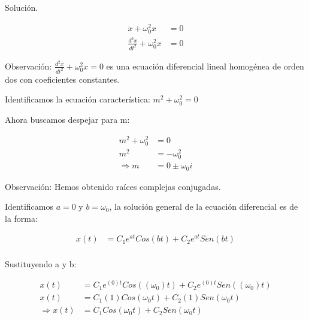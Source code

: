 

 Solución.

 \begin{align*}
    \ddot{x} + \omega_{0}^{2} x &= 0 \\
    \frac{d^{2} x}{dt^{2}} + \omega_{0}^{2} x &= 0 
\end{align*}

Observación: $\frac{d^{2} x}{dt^{2}} + \omega_{0}^{2} x = 0 $ es una ecuación diferencial lineal
homogénea de orden dos con coeficientes constantes.

\vspace*{0.3 cm}

Identificamos la ecuación característica: $ m^{2} + \omega_{0}^{2} = 0 $

Ahora buscamos despejar para m:

\begin{align*}
    m^{2} + \omega_{0}^{2} &= 0 \\
    m^{2}  &= - \omega_{0}^{2} \\
    \Rightarrow m &= 0 \pm \omega_{0} i
\end{align*}

Observación: Hemos obtenido raíces complejas conjugadas.

\vspace*{0.3 cm}

Identificamos $ a=0$ y $b=\omega_{0} $, la solución general de la ecuación diferencial
es de la forma:

\begin{align*}
    x(t) &= C_{1}e^{at}Cos(bt) + C_{2}e^{at}Sen(bt) \\
\end{align*}

Sustituyendo a y b:

\begin{align*}
    x(t) &= C_{1}e^{(0)t}Cos((\omega_{0})t) + C_{2}e^{(0)t}Sen((\omega_{0})t) \\
    x(t) &= C_{1}(1)Cos(\omega_{0}t) + C_{2}(1)Sen(\omega_{0}t) \\
    \Rightarrow x(t) &= C_{1}Cos(\omega_{0}t) + C_{2}Sen(\omega_{0}t)
\end{align*}


